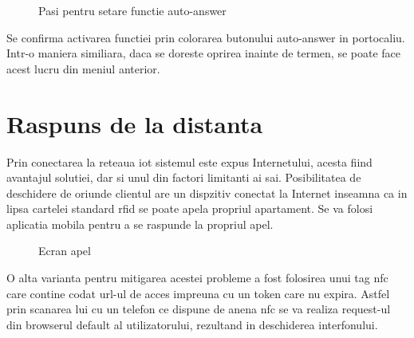 \begin{figure}[H]
\begin{center}
  \hfil
  \caption{Pasi pentru setare functie auto-answer}
  \label{fig:autoanswer}
\end{center}
\end{figure}

Se confirma activarea functiei prin colorarea butonului auto-answer in portocaliu. Intr-o maniera similiara, daca se doreste oprirea inainte de termen, se poate face acest lucru din meniul anterior.

\section{Raspuns de la distanta}

Prin conectarea la reteaua \acrshort{iot} sistemul este expus Internetului, acesta fiind avantajul solutiei, dar si unul din factori limitanti ai sai. Posibilitatea de deschidere de oriunde clientul are un dispzitiv conectat la Internet inseamna ca in lipsa cartelei standard \acrfull{rfid} se poate apela propriul apartament. Se va folosi aplicatia mobila pentru a se raspunde la propriul apel.

\begin{figure}[H]
\begin{center}
  \hfil
  \caption{Ecran apel}
  \label{fig:ringing}
\end{center}
\end{figure}

O alta varianta pentru mitigarea acestei probleme a fost folosirea unui tag \acrfull{nfc} care contine codat url-ul de acces impreuna cu un token care nu expira. Astfel prin scanarea lui cu un telefon ce dispune de anena \acrshort{nfc} se va realiza request-ul din browserul default al utilizatorului, rezultand in deschiderea interfonului.
